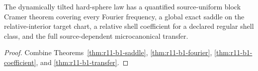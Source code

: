 \begin{theorem}
\label{thm:r11-b1-main}
The dynamically tilted hard-sphere law has a quantified source-uniform block
Cramer theorem covering every Fourier frequency, a global exact saddle on the
relative-interior target chart, a relative shell coefficient for a declared
regular shell class, and the full source-dependent microcanonical transfer.
\end{theorem}

\begin{proof}
Combine Theorems~\ref{thm:r11-b1-saddle},
\ref{thm:r11-b1-fourier}, \ref{thm:r11-b1-coefficient}, and
\ref{thm:r11-b1-transfer}.
\end{proof}
